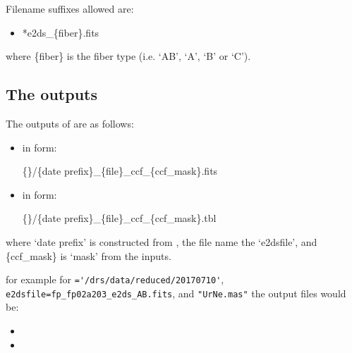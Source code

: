 \noindent Filename suffixes allowed are:
\begin{itemize}
	\item *e2ds\_\{fiber\}.fits
\end{itemize}
\noindent where \{fiber\} is the fiber type (i.e. `AB', `A', `B' or `C').

\subsection{The outputs}
The outputs of \calCCF are as follows:

\begin{itemize}

\item {} in form:
\begin{tcustomdir}
\{\reduceddir\}/\{date prefix\}\_\{file\}\_ccf\_\{ccf\_mask\}.fits
\end{tcustomdir}

\item {} in form:
\begin{tcustomdir}
\{\reduceddir\}/\{date prefix\}\_\{file\}\_ccf\_\{ccf\_mask\}.tbl
\end{tcustomdir}

\end{itemize}


\noindent where `date prefix' is constructed from \argnightname , the file name the `e2dsfile', and \{ccf\_mask\} is `mask' from the inputs.


\noindent for example for \reduceddir\lstinline[style=pythoninline]|='/drs/data/reduced/20170710'|, \lstinline[style=pythoninline]|e2dsfile=fp_fp02a203_e2ds_AB.fits|, and \lstinline[style=pythoninline]|"UrNe.mas"| the output files would be:
\begin{tcustomdir}
\begin{itemize}
\item {}
\item {}
\end{itemize}
\end{tcustomdir}



